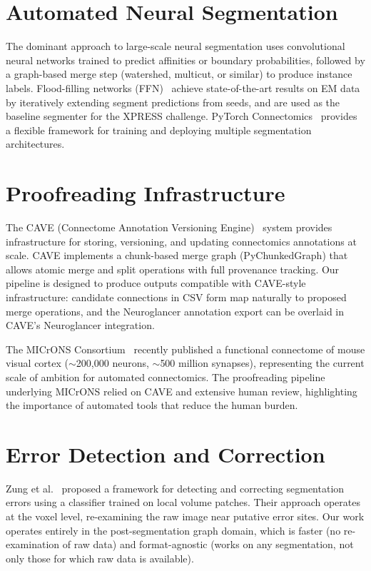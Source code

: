 \section{Automated Neural Segmentation}

The dominant approach to large-scale neural segmentation uses convolutional
neural networks trained to predict affinities or boundary probabilities, followed
by a graph-based merge step (watershed, multicut, or similar) to produce
instance labels. Flood-filling networks (FFN)~\cite{januszewski2018high} achieve
state-of-the-art results on EM data by iteratively extending segment predictions
from seeds, and are used as the baseline segmenter for the XPRESS challenge.
PyTorch Connectomics~\cite{lin2021pytorch} provides a flexible framework for
training and deploying multiple segmentation architectures.

\section{Proofreading Infrastructure}

The CAVE (Connectome Annotation Versioning Engine)~\cite{dorkenwald2025cave}
system provides infrastructure for storing, versioning, and updating connectomics
annotations at scale. CAVE implements a chunk-based merge graph (PyChunkedGraph)
that allows atomic merge and split operations with full provenance tracking.
Our pipeline is designed to produce outputs compatible with CAVE-style
infrastructure: candidate connections in CSV form map naturally to proposed
merge operations, and the Neuroglancer annotation export can be overlaid in
CAVE's Neuroglancer integration.

The MICrONS Consortium~\cite{microns2025} recently published a functional
connectome of mouse visual cortex ($\sim$200{,}000 neurons, $\sim$500 million
synapses), representing the current scale of ambition for automated connectomics.
The proofreading pipeline underlying MICrONS relied on CAVE and extensive human
review, highlighting the importance of automated tools that reduce the human
burden.

\section{Error Detection and Correction}

Zung et al.~\cite{zung2017} proposed a framework for detecting and correcting
segmentation errors using a classifier trained on local volume patches. Their
approach operates at the voxel level, re-examining the raw image near putative
error sites. Our work operates entirely in the post-segmentation graph domain,
which is faster (no re-examination of raw data) and format-agnostic (works on
any segmentation, not only those for which raw data is available).

